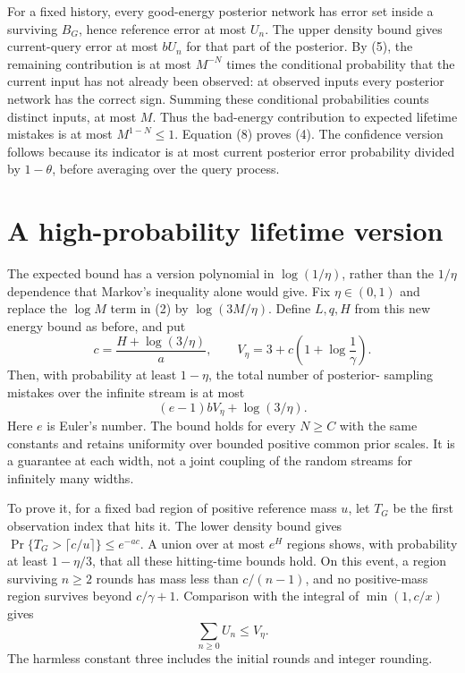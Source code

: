\documentclass[11pt]{article}
\begin{document}
For a fixed history, every good-energy posterior network has error
set inside a surviving $B_G$, hence reference error at most $U_n$.
The upper density bound gives current-query error at most $bU_n$ for
that part of the posterior. By (5), the remaining contribution is at
most $M^{-N}$ times the conditional probability that the current input
has not already been observed: at observed inputs every posterior
network has the correct sign. Summing these conditional probabilities
counts distinct inputs, at most $M$. Thus the bad-energy contribution
to expected lifetime mistakes is at most $M^{1-N}\le1$.
Equation (8) proves (4). The confidence version follows because its
indicator is at most current posterior error probability divided by
$1-\theta$, before averaging over the query process.

\section{A high-probability lifetime version}
The expected bound has a version polynomial in $\log(1/\eta)$, rather
than the $1/\eta$ dependence that Markov's inequality alone would give.
Fix $\eta\in(0,1)$ and replace the $\log M$ term in (2) by
$\log(3M/\eta)$. Define $L,q,H$ from this new energy bound as before,
and put
\[
 c=\frac{H+\log(3/\eta)}a,\qquad
 V_\eta=3+c\left(1+\log\frac1\gamma\right).
\]
Then, with probability at least $1-\eta$, the total number of posterior-
sampling mistakes over the infinite stream is at most
\[
                 (e-1)bV_\eta+\log(3/\eta).             \tag{9}
\]
Here $e$ is Euler's number. The bound holds for every $N\ge C$ with
the same constants and retains uniformity over bounded positive common
prior scales. It is a guarantee at each width, not a joint coupling of
the random streams for infinitely many widths.

To prove it, for a fixed bad region of positive reference mass $u$, let
$T_G$ be the first observation index that hits it. The lower density
bound gives
$\Pr\{T_G>\lceil c/u\rceil\}\le e^{-ac}$.
A union over at most $e^H$ regions shows, with probability at least
$1-\eta/3$, that all these hitting-time bounds hold. On this event, a
region surviving $n\ge2$ rounds has mass less than $c/(n-1)$, and no
positive-mass region survives beyond $c/\gamma+1$. Comparison with
the integral of $\min(1,c/x)$ gives
\[
                        \sum_{n\ge0}U_n\le V_\eta.      \tag{10}
\]
The harmless constant three includes the initial rounds and integer
rounding.
\end{document}
